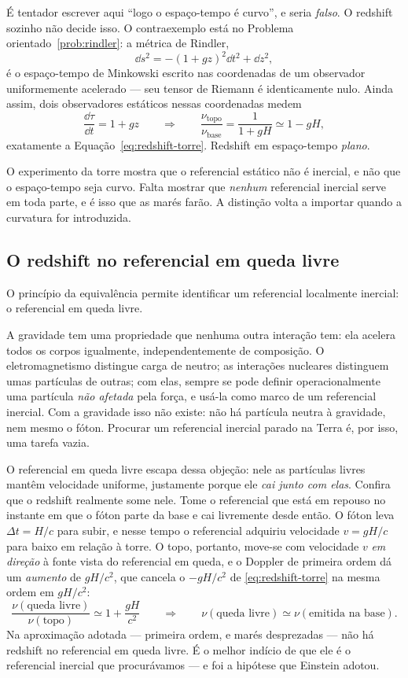 \documentclass[12pt,a4paper,oneside]{book}
\theoremstyle{rgplain}
\theoremstyle{rgremark}
\begin{document}
\begin{atencao}[title={\sffamily\bfseries\footnotesize\color{rgTerracota}O QUE O REDSHIFT AINDA NÃO PROVOU}]
É tentador escrever aqui ``logo o espaço-tempo é curvo'', e seria \emph{falso}.
O redshift sozinho não decide isso. O contraexemplo está no
Problema orientado~\ref{prob:rindler}: a métrica de Rindler,
\[
  \dd s^2=-(1+gz)^2\dd t^2+\dd z^2 ,
\]
é o espaço-tempo de Minkowski escrito nas coordenadas de um observador
uniformemente acelerado --- seu tensor de Riemann é identicamente nulo. Ainda
assim, dois observadores estáticos nessas coordenadas medem
\[
  \frac{\dd\tau}{\dd t}=1+gz
  \qquad\Longrightarrow\qquad
  \frac{\nu_{\text{topo}}}{\nu_{\text{base}}}=\frac{1}{1+gH}\simeq1-gH ,
\]
exatamente a Equação~\eqref{eq:redshift-torre}. Redshift em espaço-tempo
\emph{plano}.

O experimento da torre mostra que o referencial estático não é inercial, e
não que o espaço-tempo seja curvo. Falta mostrar que \emph{nenhum}
referencial inercial serve em toda parte, e é isso que as marés farão. A
distinção volta a importar quando a curvatura for introduzida.
\end{atencao}

\subsection*{O redshift no referencial em queda livre}

O princípio da equivalência permite identificar um referencial localmente
inercial: o referencial em queda livre.

A gravidade tem uma propriedade que nenhuma outra interação tem: ela acelera
todos os corpos igualmente, independentemente de composição. O
eletromagnetismo distingue carga de neutro; as interações nucleares distinguem
umas partículas de outras; com elas, sempre se pode definir operacionalmente
uma partícula \emph{não afetada} pela força, e usá-la como marco de um
referencial inercial. Com a gravidade isso não existe: não há partícula
neutra à gravidade, nem mesmo o fóton. Procurar um referencial inercial parado
na Terra é, por isso, uma tarefa vazia.

O referencial em queda livre escapa dessa objeção: nele as partículas livres
mantêm velocidade uniforme, justamente porque ele \emph{cai junto com elas}.
Confira que o redshift realmente some nele. Tome o referencial que está em repouso no instante em que o fóton
parte da base e cai livremente desde então. O fóton leva $\Delta t=H/c$ para
subir, e nesse tempo o referencial adquiriu velocidade $v=gH/c$ para baixo em
relação à torre. O topo, portanto, move-se com velocidade $v$ \emph{em
direção} à fonte vista do referencial em queda, e o Doppler de primeira ordem
dá um \emph{aumento} de $gH/c^2$, que cancela o
$-gH/c^2$ de \eqref{eq:redshift-torre} na mesma ordem em $gH/c^2$:
\[
  \frac{\nu(\text{queda livre})}{\nu(\text{topo})}
  \simeq 1+\frac{gH}{c^{2}}
  \qquad\Longrightarrow\qquad
  \nu(\text{queda livre})\simeq\nu(\text{emitida na base}).
\]
Na aproximação adotada --- primeira ordem, e marés desprezadas --- não há
redshift no referencial em queda livre. É o melhor indício de que ele é
o referencial inercial que procurávamos --- e foi a hipótese que Einstein
adotou.
\end{document}
